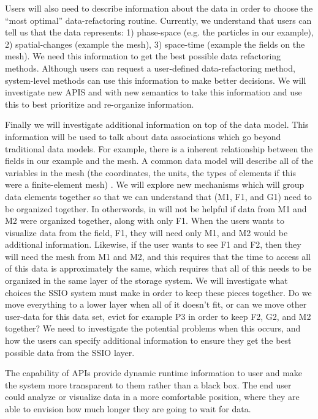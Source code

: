 Users will also need to describe information about the data in order to choose the ``most optimal'' data-refactoring routine. Currently, we understand
that users can tell us that the data represents: 1) phase-space (e.g. the particles in our example), 2) spatial-changes (example the mesh), 3) space-time
(example the fields on the mesh). We need this information to get the best possible data refactoring methods. Although users can request 
a user-defined data-refactoring method, system-level methods can use this information to make better decisions. We will investigate new APIS 
and with new semantics to take this information and use this to best prioritize and re-organize information.

Finally we will investigate additional information on top of the data model. This information will be used to talk about data associations which go
beyond traditional data models. For example, there is a inherent relationship between the fields in our example and the mesh. A common data model
will describe all of the variables in the mesh (the coordinates, the units, the types of elements if this were a finite-element mesh) . We will explore
new mechanisms which will group data elements together so that we can understand that (M1, F1, and G1) need to be organized together. 
In otherwords, in will not be helpful if data from M1 and M2 were organized together, along with only F1. When the users wants to visualize data from 
the field, F1, they will need only M1, and M2 would be additional information. Likewise, if the user wants to see F1 and F2, then they will need the
mesh from M1 and M2, and this requires that the time to access all of this data is approximately the same, which requires that all of this needs
to be organized in the same layer of the storage system.  We will investigate what choices the SSIO system must make in order to keep these
pieces together. Do we move everything to a lower layer when all of it doesn't fit, or can we move other user-data for this data set, evict for example
P3 in order to keep F2, G2, and M2 together? We need to investigate the potential problems when this occurs, and how the users can specify
additional information to ensure they get the best possible data from the SSIO layer.


The capability of APIs provide dynamic runtime information to user and make the system 
more transparent to them rather than a black box. The end user could analyze or visualize data 
in a more comfortable position, where they are able to envision 
how much longer they are going to wait for data. 


